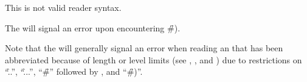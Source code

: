 
This is not valid reader syntax.

The  will signal an error 
upon encountering \f{\#)}.

\endsubsubsection%

\endsubsection%


Note that the  will 
generally
signal an error 
when reading an  that has been
abbreviated because of length or level limits 
(see ,
     ,
 and )
due to restrictions on ``\f{..}'', ``\f{...}'', ``\f{\#}'' followed by ,
and ``\f{\#)}''.

\endsubsection%
